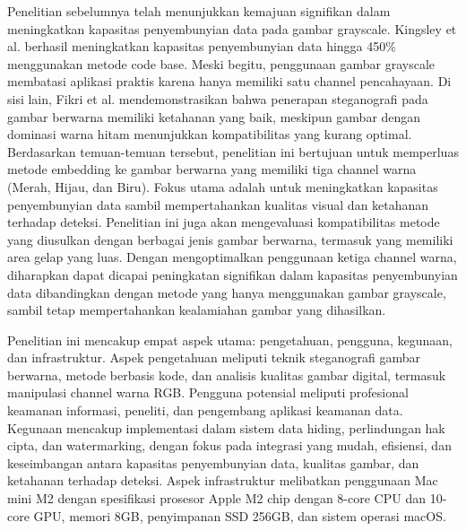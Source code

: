 \documentclass{ittelkom}
\begin{document}
Penelitian sebelumnya telah menunjukkan kemajuan signifikan dalam meningkatkan
kapasitas penyembunyian data pada gambar grayscale. Kingsley et al.
\cite{kingsley2020improving} berhasil meningkatkan kapasitas penyembunyian data
hingga 450\% menggunakan metode code base. Meski begitu, penggunaan gambar
grayscale membatasi aplikasi praktis karena hanya memiliki satu channel
pencahayaan. Di sisi lain, Fikri et al. \cite{fikri2022optimasi}
mendemonstrasikan bahwa penerapan steganografi pada gambar berwarna memiliki
ketahanan yang baik, meskipun gambar dengan dominasi warna hitam menunjukkan
kompatibilitas yang kurang optimal. Berdasarkan temuan-temuan tersebut,
penelitian ini bertujuan untuk memperluas metode embedding ke gambar berwarna
yang memiliki tiga channel warna (Merah, Hijau, dan Biru). Fokus utama adalah
untuk meningkatkan kapasitas penyembunyian data sambil mempertahankan kualitas
visual dan ketahanan terhadap deteksi. Penelitian ini juga akan mengevaluasi
kompatibilitas metode yang diusulkan dengan berbagai jenis gambar berwarna,
termasuk yang memiliki area gelap yang luas. Dengan mengoptimalkan penggunaan
ketiga channel warna, diharapkan dapat dicapai peningkatan signifikan dalam
kapasitas penyembunyian data dibandingkan dengan metode yang hanya menggunakan
gambar grayscale, sambil tetap mempertahankan kealamiahan gambar yang
dihasilkan.

Penelitian ini mencakup empat aspek utama: pengetahuan, pengguna, kegunaan, dan
infrastruktur. Aspek pengetahuan meliputi teknik steganografi gambar berwarna,
metode berbasis kode, dan analisis kualitas gambar digital, termasuk manipulasi
channel warna RGB. Pengguna potensial meliputi profesional keamanan informasi,
peneliti, dan pengembang aplikasi keamanan data. Kegunaan mencakup implementasi
dalam sistem data hiding, perlindungan hak cipta, dan watermarking, dengan
fokus pada integrasi yang mudah, efisiensi, dan keseimbangan antara kapasitas
penyembunyian data, kualitas gambar, dan ketahanan terhadap deteksi. Aspek
infrastruktur melibatkan penggunaan Mac mini M2 dengan spesifikasi prosesor
Apple M2 chip dengan 8-core CPU dan 10-core GPU, memori 8GB, penyimpanan SSD
256GB, dan sistem operasi macOS.
\end{document}
